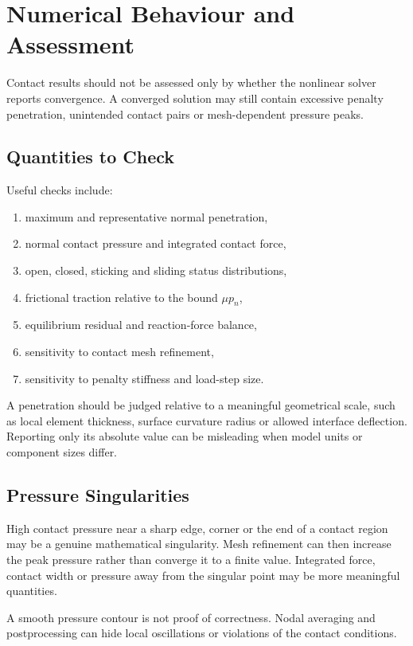 \section{Numerical Behaviour and Assessment}

Contact results should not be assessed only by whether the nonlinear solver
reports convergence. A converged solution may still contain excessive penalty
penetration, unintended contact pairs or mesh-dependent pressure peaks.

\subsection{Quantities to Check}

Useful checks include:

\begin{enumerate}
    \item maximum and representative normal penetration,
    \item normal contact pressure and integrated contact force,
    \item open, closed, sticking and sliding status distributions,
    \item frictional traction relative to the bound $ \mu p_n $,
    \item equilibrium residual and reaction-force balance,
    \item sensitivity to contact mesh refinement,
    \item sensitivity to penalty stiffness and load-step size.
\end{enumerate}

A penetration should be judged relative to a meaningful geometrical scale, such
as local element thickness, surface curvature radius or allowed interface
deflection. Reporting only its absolute value can be misleading when model units
or component sizes differ.

\subsection{Pressure Singularities}

High contact pressure near a sharp edge, corner or the end of a contact region
may be a genuine mathematical singularity. Mesh refinement can then increase
the peak pressure rather than converge it to a finite value. Integrated force,
contact width or pressure away from the singular point may be more meaningful
quantities.

A smooth pressure contour is not proof of correctness. Nodal averaging and
postprocessing can hide local oscillations or violations of the contact
conditions.

